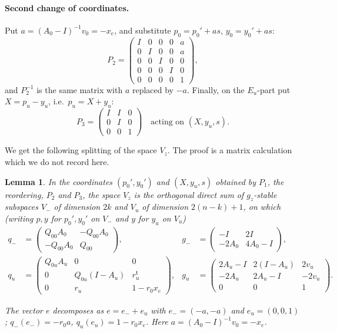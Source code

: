 \documentclass[11pt,oneside,notitlepage]{book}
\numberwithin{equation}{section}
\theoremstyle{plain}
\newtheorem{lemma}[theorem]{Lemma}
\theoremstyle{definition}
\begin{document}
\paragraph{Second change of coordinates.} Put $a=(A_0-I)^{-1}v_0=-x_e$, and substitute $p_0=p_0'+as$, $y_0=y_0'+as$:
\[
P_2=\begin{pmatrix}I&0&0&0&a\\0&I&0&0&a\\0&0&I&0&0\\0&0&0&I&0\\0&0&0&0&1\end{pmatrix},
\]
and $P_2^{-1}$ is the same matrix with $a$ replaced by $-a$. Finally, on the $E_u$-part put $X=p_u-y_u$, i.e.\ $p_u=X+y_u$:
\[
P_3=\begin{pmatrix}I&I&0\\0&I&0\\0&0&1\end{pmatrix}\quad\text{acting on }(X,y_u,s).
\]

We get the following splitting of the space $V_z$. The proof is a matrix calculation which we do not record here.
\begin{lemma}\label{lem:Vsplit}
In the coordinates $(p_0',y_0')$ and $(X,y_u,s)$ obtained by $P_1$, the reordering, $P_2$ and $P_3$, the space $V_z$ is the orthogonal direct sum of $g_z$-stable subspaces $V_-$ of dimension $2k$ and $V_u$ of dimension $2(n-k)+1$, on which (writing $p,y$ for $p_0',y_0'$ on $V_-$ and $y$ for $y_u$ on $V_u$)
\begin{align*}
q_-&=\begin{pmatrix}Q_{00}A_0&-Q_{00}A_0\\-Q_{00}A_0&Q_{00}\end{pmatrix}, &
g_-&=\begin{pmatrix}-I&2I\\-2A_0&4A_0-I\end{pmatrix},\\
q_u&=\begin{pmatrix}Q_{0u}A_u&0&0\\0&Q_{0u}(I-A_u)&r_u^{\mathsf t}\\0&r_u&1-r_0x_e\end{pmatrix}, &
g_u&=\begin{pmatrix}2A_u-I&2(I-A_u)&2v_u\\-2A_u&2A_u-I&-2v_u\\0&0&1\end{pmatrix}.
\end{align*}

 The vector $e$ decomposes as $e=e_-+e_u$ with $e_-=(-a,-a)$ and $e_u=(0,0,1)$; $q_-(e_-)=-r_0a$, $q_u(e_u)=1-r_0x_e$. Here $a=(A_0-I)^{-1}v_0=-x_e$.
\end{lemma}
\end{document}
